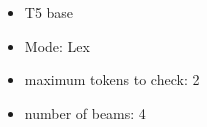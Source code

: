 \pagebreak
\begin{itemize}
    \item T5 base
    \item Mode: Lex
    \item maximum tokens to check: 2
    \item number of beams: 4
\end{itemize}





